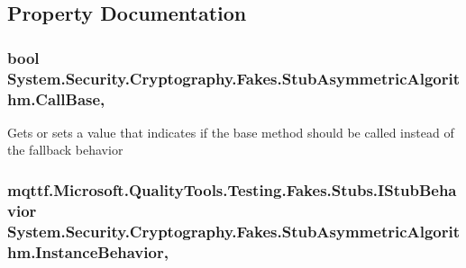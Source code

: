 \subsection{Property Documentation}
\hypertarget{class_system_1_1_security_1_1_cryptography_1_1_fakes_1_1_stub_asymmetric_algorithm_aae85520be792ac4d66d1637bf8b739d5}{
\subsubsection[{Call\-Base}]{\setlength{\rightskip}{0pt plus 5cm}bool System.\-Security.\-Cryptography.\-Fakes.\-Stub\-Asymmetric\-Algorithm.\-Call\-Base\hspace{0.3cm}{\ttfamily [get]}, {\ttfamily [set]}}}\label{class_system_1_1_security_1_1_cryptography_1_1_fakes_1_1_stub_asymmetric_algorithm_aae85520be792ac4d66d1637bf8b739d5}


Gets or sets a value that indicates if the base method should be called instead of the fallback behavior

\hypertarget{class_system_1_1_security_1_1_cryptography_1_1_fakes_1_1_stub_asymmetric_algorithm_adf4e59888a4df8e1e819bc3dacc12005}{
\subsubsection[{Instance\-Behavior}]{\setlength{\rightskip}{0pt plus 5cm}mqttf.\-Microsoft.\-Quality\-Tools.\-Testing.\-Fakes.\-Stubs.\-I\-Stub\-Behavior System.\-Security.\-Cryptography.\-Fakes.\-Stub\-Asymmetric\-Algorithm.\-Instance\-Behavior\hspace{0.3cm}{\ttfamily [get]}, {\ttfamily [set]}}}\label{class_system_1_1_security_1_1_cryptography_1_1_fakes_1_1_stub_asymmetric_algorithm_adf4e59888a4df8e1e819bc3dacc12005}


